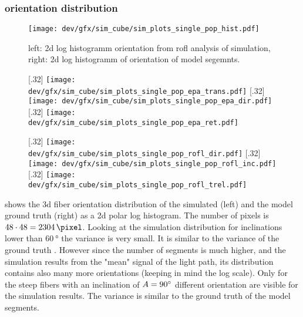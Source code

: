 \subsubsection{orientation distribution}
% 
\begin{figure}[!tp]
\centering
\texttt{[image: dev/gfx/sim\_cube/sim\_plots\_single\_pop\_hist.pdf]} 
\caption[sim]{left: 2d log histogramm orientation from rofl analysis of simulation, right: 2d log histogramm of orientation of model segemnts. }
\label{fig:single_fiber_pop_hist}
\end{figure}
% 
% 
% 
\begin{figure}[!tp]
\centering
{}[.32\textwidth]{
\texttt{[image: dev/gfx/sim\_cube/sim\_plots\_single\_pop\_epa\_trans.pdf]}}\hfill
{}[.32\textwidth]{
\texttt{[image: dev/gfx/sim\_cube/sim\_plots\_single\_pop\_epa\_dir.pdf]}}\hfill
{}[.32\textwidth]{
\texttt{[image: dev/gfx/sim\_cube/sim\_plots\_single\_pop\_epa\_ret.pdf]}}
\caption[]{}
\label{fig:single_fiber_pop_epa}
\end{figure}
% 
\begin{figure}[!tp]
\centering
{}[.32\textwidth]{
\texttt{[image: dev/gfx/sim\_cube/sim\_plots\_single\_pop\_rofl\_dir.pdf]}}\hfill
{}[.32\textwidth]{
\texttt{[image: dev/gfx/sim\_cube/sim\_plots\_single\_pop\_rofl\_inc.pdf]}}\hfill
{}[.32\textwidth]{
\texttt{[image: dev/gfx/sim\_cube/sim\_plots\_single\_pop\_rofl\_trel.pdf]}}
\caption[]{}
\label{fig:single_fiber_pop_rofl}
\end{figure}
% 
 shows the 3d fiber orientation distribution of the simulated (left) and the model ground truth (right) as a 2d polar log histogram.
The number of pixels is $48\cdot48=\SI{2304}{\pixel}$.
Looking at the simulation distribution for inclinations lower than $\SI{60}{\degree}$ the variance is very small.
It is similar to the variance of the ground truth .
However since the number of segments is much higher, and the simulation results from the "mean" signal of the light path, its distribution contains also many more orientations (keeping in mind the log scale).
Only for the steep fibers with an inclination of $\textnormal{$A$}{}=\SI{90}{\degree}$ different orientation are visible for the simulation results.
The variance is similar to the ground truth of the model segments.
% 
% 
